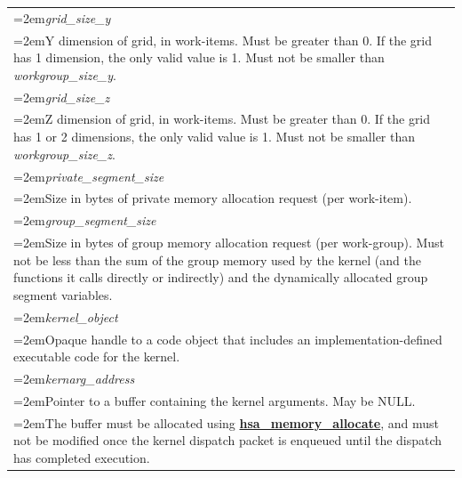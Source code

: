 \documentclass[final,oneside]{book}
\newcommand{\reffun}[1]{\textbf{#1}}
\newcommand{\reffld}[1]{\textit{#1}}
\begin{document}
\begin{longtable}{@{}>{\hangindent=2em}p{\textwidth}}
\hypertarget{hsa_\-kernel_\-dispatch_\-packet_\-t.grid_\-size_\-y}{\reffld{grid_\-size_\-y}}\\\hspace{2em}Y dimension of grid, in work-items. Must be greater than 0. If the grid has 1 dimension, the only valid value is 1. Must not be smaller than \textit{workgroup_\-size_\-y}.\\[2mm]
\hypertarget{hsa_\-kernel_\-dispatch_\-packet_\-t.grid_\-size_\-z}{\reffld{grid_\-size_\-z}}\\\hspace{2em}Z dimension of grid, in work-items. Must be greater than 0. If the grid has 1 or 2 dimensions, the only valid value is 1. Must not be smaller than \textit{workgroup_\-size_\-z}.\\[2mm]
\hypertarget{hsa_\-kernel_\-dispatch_\-packet_\-t.private_\-segment_\-size}{\reffld{private_\-segment_\-size}}\\\hspace{2em}Size in bytes of private memory allocation request (per work-item).\\[2mm]
\hypertarget{hsa_\-kernel_\-dispatch_\-packet_\-t.group_\-segment_\-size}{\reffld{group_\-segment_\-size}}\\\hspace{2em}Size in bytes of group memory allocation request (per work-group). Must not be less than the sum of the group memory used by the kernel (and the functions it calls directly or indirectly) and the dynamically allocated group segment variables.\\[2mm]
\hypertarget{hsa_\-kernel_\-dispatch_\-packet_\-t.kernel_\-object}{\reffld{kernel_\-object}}\\\hspace{2em}Opaque handle to a code object that includes an implementation-defined executable code for the kernel.\\[2mm]
\hypertarget{hsa_\-kernel_\-dispatch_\-packet_\-t.kernarg_\-address}{\reffld{kernarg_\-address}}\\\hspace{2em}Pointer to a buffer containing the kernel arguments. May be NULL.\\[1.25mm]
\hspace{2em}The buffer must be allocated using \hyperlink{group__memory_1ga39f7943b93aa2bb754726fc74d929426}{\reffun{hsa_\-memory_\-allocate}}, and must not be modified once the kernel dispatch packet is enqueued until the dispatch has completed execution.\\[2mm]

\end{longtable}
\end{document}
